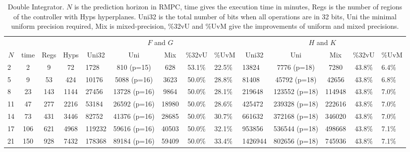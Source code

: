 \begin{table*}
  \centering
  \caption{Double Integrator.\textmd{ $N$ is the prediction horizon in RMPC, time gives the execution time in minutes, Regs is the number of regions of the controller with Hyps hyperplanes. Uni32 is the total number of bits when all operations are in 32 bits, Uni the minimal uniform precision required, Mix is mixed-precision, \%32vU and \%UvM give the improvements of uniform and mixed precisions.}}
  \label{tab:di}
  \renewcommand{\arraystretch}{.2}
  \setlength{\tabcolsep}{-0em} %
  \begin{tabular}{lccc|lcccl|lcccl}
    \toprule
    \multicolumn{4}{c}{} & \multicolumn{5}{|c|}{$F$ and $G$} & \multicolumn{5}{c}{$H$ and $K$} \\
    \multicolumn{1}{c}{$N$\:}&
    \multicolumn{1}{c}{time\:}&
    \multicolumn{1}{c}{Regs} &
    \multicolumn{1}{c}{Hyps} &
    \multicolumn{1}{|c}{Uni32}&
    \multicolumn{1}{c}{Uni}&
    \multicolumn{1}{c}{Mix}&
    \multicolumn{1}{c}{\%32vU\;}&
    \multicolumn{1}{c}{\%UvM}&
    \multicolumn{1}{|c}{Uni32}&
    \multicolumn{1}{c}{Uni}&
    \multicolumn{1}{c}{Mix}&
    \multicolumn{1}{c}{\%32vU\;}&
    \multicolumn{1}{c}{\%UvM} \\
    \midrule
    2 & 2 & 9 & 72 & 1728 & 810 (p=15) & 628 & 53.1\% & 22.5\% & 13824 & 7776 (p=18) & 7280 & 43.8\%& 6.4\% \\
    5 & 9 & 53 & 424 & 10176 & 5088 (p=16) & 3623 & 50.0\% & 28.8\% & 81408 & 45792 (p=18) & 42656 & 43.8\% & 6.8\% \\
    8 & 23 & 143 & 1144 & 27456 & 13728 (p=16) & 9864 & 50.0\%  & 28.1\% & 219648 & 123552 (p=18) & 114948 & 43.8\% & 7.0\% \\
    11 & 47 & 277 & 2216 & 53184 & 26592 (p=16) & 18980 & 50.0\% & 28.6\% & 425472 & 239328 (p=18) & 222616 & 43.8\% & 7.0\% \\
    
    14 & 73 & 431& 3446& 82752& 41376 (p=16)& 28685& 50.0\% & 30.7\% & 661632& 372168 (p=18)& 346020& 43.8\% &7.0\% \\
    
    17 & 106 & 621 & 4968 & 119232 & 59616 (p=16) & 40503 & 50.0\% & 32.1\% & 953856& 536544 (p=18)& 498668& 43.8\% & 7.1\% \\
    
    21 & 150 & 928 & 7432 & 178368 & 89184 (p=16) & 59409 & 50.0\% & 33.4\% & 1426944 & 802656 (p=18) & 745936 & 43.8\% & 7.1\%  \\
    

\end{tabular}
\end{table*}
